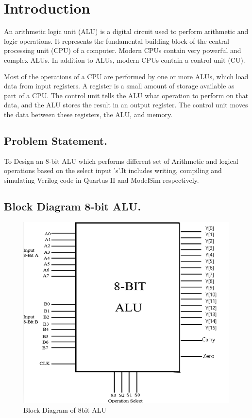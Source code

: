 \documentclass[12pt,singleside,a4paper]{article}
\begin{document}
\newpage
\section{Introduction}
An arithmetic logic unit (ALU) is a digital circuit used to perform arithmetic and logic operations. It represents the fundamental building block of the central processing unit (CPU) of a computer. Modern CPUs contain very powerful and complex ALUs. In addition to ALUs, modern CPUs contain a control unit (CU).

Most of the operations of a CPU are performed by one or more ALUs, which load data from input registers. A register is a small amount of storage available as part of a CPU. The control unit tells the ALU what operation to perform on that data, and the ALU stores the result in an output register. The control unit moves the data between these registers, the ALU, and memory. 

\subsection{Problem Statement.}
 To Design an 8-bit ALU which performs different set of Arithmetic and logical operations based on the select input 's'.It includes writing, compiling and simulating Verilog code in Quartus II and  ModelSim respectively.

\newline



\subsection{Block Diagram 8-bit ALU.}
\begin{figure}[H]
    \centering
    \includegraphics[scale=0.8]{NEWALUBLOCK.png}
    \caption{Block Diagram of 8bit ALU}
\end{figure}
\newpage
\end{document}
